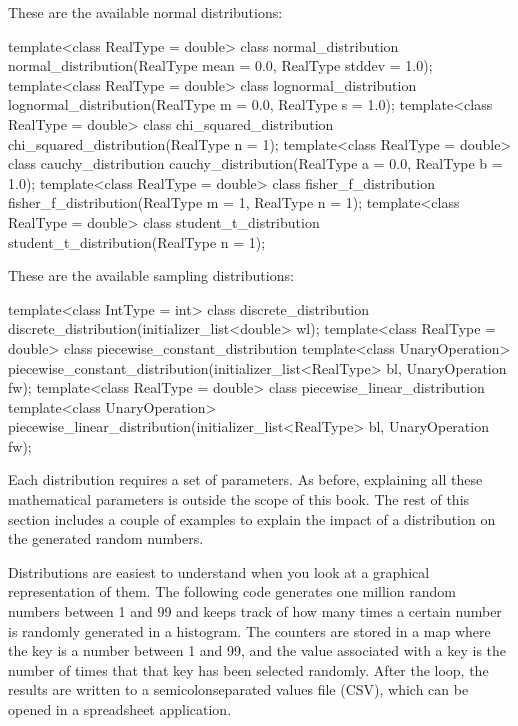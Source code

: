 These are the available normal distributions:

\begin{cpp}
template<class RealType = double> class normal_distribution
    normal_distribution(RealType mean = 0.0, RealType stddev = 1.0);
template<class RealType = double> class lognormal_distribution
    lognormal_distribution(RealType m = 0.0, RealType s = 1.0);
template<class RealType = double> class chi_squared_distribution
    chi_squared_distribution(RealType n = 1);
template<class RealType = double> class cauchy_distribution
    cauchy_distribution(RealType a = 0.0, RealType b = 1.0);
template<class RealType = double> class fisher_f_distribution
    fisher_f_distribution(RealType m = 1, RealType n = 1);
template<class RealType = double> class student_t_distribution
    student_t_distribution(RealType n = 1);
\end{cpp}

These are the available sampling distributions:

\begin{cpp}
template<class IntType = int> class discrete_distribution
    discrete_distribution(initializer_list<double> wl);
template<class RealType = double> class piecewise_constant_distribution
    template<class UnaryOperation>
        piecewise_constant_distribution(initializer_list<RealType> bl,
            UnaryOperation fw);
template<class RealType = double> class piecewise_linear_distribution
    template<class UnaryOperation>
        piecewise_linear_distribution(initializer_list<RealType> bl,
            UnaryOperation fw);
\end{cpp}

Each distribution requires a set of parameters. As before, explaining all these mathematical parameters is outside the scope of this book. The rest of this section includes a couple of examples to explain the impact of a distribution on the generated random numbers.

Distributions are easiest to understand when you look at a graphical representation of them. The following code generates one million random numbers between 1 and 99 and keeps track of how many times a certain number is randomly generated in a histogram. The counters are stored in a map where the key is a number between 1 and 99, and the value associated with a key is the number of times that that key has been selected randomly. After the loop, the results are written to a semicolonseparated values file (CSV), which can be opened in a spreadsheet application.


